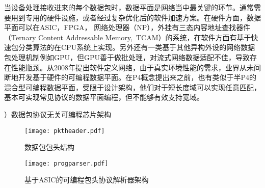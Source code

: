 当设备处理接收进来的每个数据包时，数据平面是网络当中最关键的环节。通常需要用到专用的硬件设施，或者经过复杂优化后的软件加速方案。在硬件方面，数据平面可以在ASIC，FPGA， 网络处理器（NP），外挂有三态内容地址查找器件（Ternary Content Addressable Memory,~TCAM）的系统，在软件方面有基于快速包分类算法的在CPU系统上实现。另外还有一类基于其他异构外设的网络数据包处理机制例如GPU，但GPU善于做批处理，对流式网络数据适配不佳，导致存在性能瓶颈。从2008年提出软件定义网络，由于真实环境性能的需求，业界从未间断地开发基于硬件的可编程数据平面。在P4概念提出来之前，也有类似于半P4的混合型可编程数据平面，受限于设计架构，他们对于短长度域可以实现任意匹配，基本可实现常见协议的数据平面编程，但不能够有效支持宽域。



{）数据包协议无关可编程芯片架构}




\begin{figure}[htbp]
	\centering 
	\vspace{-1.5mm}
	\begin{minipage}[t]{0.48\textwidth}
		\centering
		\texttt{[image: pktheader.pdf]}
		\caption{数据包包头结构} \label{fig:pktheader}
	\end{minipage}
	\begin{minipage}[t]{0.48\textwidth}
		\centering
		\texttt{[image: progparser.pdf]}
		\caption{基于ASIC的可编程包头协议解析器架构} \label{fig:progparser}
	\end{minipage}
\end{figure}



